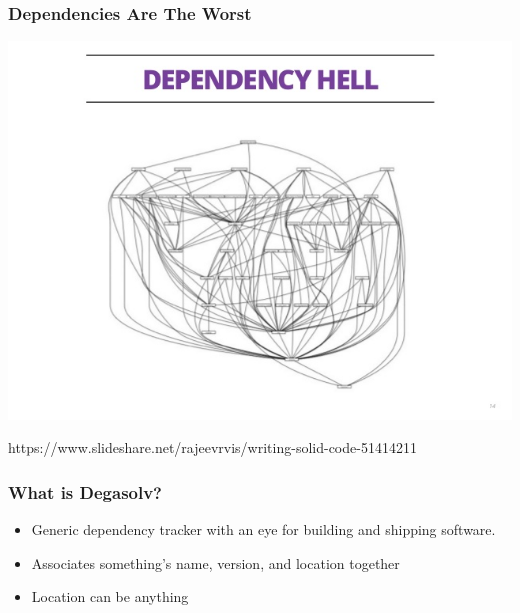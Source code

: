 \documentclass{beamer}
\begin{document}
\begin{frame}[fragile]
  \frametitle{Dependencies Are The Worst}
    \centerline{\includegraphics[scale=0.3]{dependencyhell.jpg}}
    \break
    \centerline{\tiny{https://www.slideshare.net/rajeevrvis/writing-solid-code-51414211}}
\end{frame}
\begin{frame}
    \frametitle{What is Degasolv?}
  \begin{itemize}
      \item Generic dependency tracker with an eye for building and shipping
          software.
      \item Associates something's name, version, and location together
      \item Location can be anything
  \end{itemize}
\end{frame}
\end{document}
